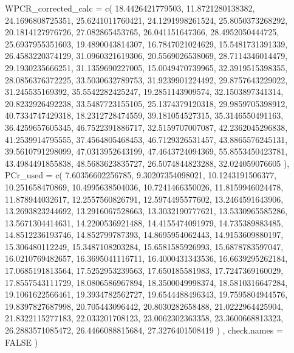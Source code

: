 \documentclass[
  letterpaper,
  DIV=11]{scrartcl}
\newenvironment{Shaded}{\begin{snugshade}}{\end{snugshade}}
\newcommand{\NormalTok}[1]{\textcolor[rgb]{0.00,0.23,0.31}{#1}}
\begin{document}
\begin{Shaded}
\begin{Highlighting}[]
\NormalTok{  \textasciigrave{}WPCR\_corrected\_calc\textasciigrave{} = c( 18.4426421779503, 11.8721280138382, 24.1696808725351, 25.6241011760421, 24.1291998261524, 25.8050373268292, 20.1814127976726, 27.082865453765, 26.041151647366, 28.4952050444725, 25.6937955351603, 19.4890043814307, 16.7847021024629, 15.5481731391339, 26.4583220374129, 31.0960321619306, 20.5569026538069, 28.7114346014479, 29.1930235666251, 31.1359690227005, 15.0049470739965, 32.3919515398355, 28.0856376372225, 33.5030632789753, 31.9239901224492, 29.8757643229022, 31.245535169392, 35.5542282425247, 19.2851143909574, 32.1503897341314, 20.8232926492238, 33.5487723155105, 25.1374379120318, 29.9859705398912, 40.7334747429318, 18.2312728474559, 39.181054527315, 35.3146550491163, 36.4259657605345, 46.7522391886717, 32.5159707007087, 42.2362045296838, 41.2539914795555, 37.4564805468453, 46.7129326531457, 43.8865576245131, 39.5610791298099, 47.0313952643199, 47.4643724094369, 55.8553450423781, 43.4984491855838, 48.5683623835727, 26.5074844823288, 32.024059076605 ),}
\NormalTok{  \textasciigrave{}PCr\_used\textasciigrave{} = c( 7.60356602256785, 9.30207354098021, 10.1243191506377, 10.251658470869, 10.4995638504036, 10.7241466350026, 11.8159946024478, 11.878944032617, 12.2557560826791, 12.5974495577602, 13.2464591643906, 13.2693823244692, 13.2916067528663, 13.3032190777621, 13.5330965585286, 13.5671304414631, 14.2200536921488, 14.4155474091979, 14.735389883485, 14.8512236193746, 14.852799787393, 14.8695954062443, 14.9153609880197, 15.306480112249, 15.3487108203284, 15.6581585926993, 15.6878783597047, 16.0210769482657, 16.3695041116711, 16.4000431343536, 16.6639295262184, 17.0685191813564, 17.5252953239563, 17.650185581983, 17.7247369160029, 17.8557543111729, 18.0806586967894, 18.3500049998374, 18.5810316647284, 19.1061622566461, 19.3934782562727, 19.6544488496343, 19.7595804944576, 19.8397827687998, 20.705443096442, 20.8030282658488, 21.0222964425904, 21.8322115277183, 22.033201708123, 23.0062302363358, 23.3600668813323, 26.2883571085472, 26.4466088815684, 27.3276401508419 )}
\NormalTok{  , check.names = FALSE}
\NormalTok{)}


\end{Highlighting}
\end{Shaded}
\end{document}
